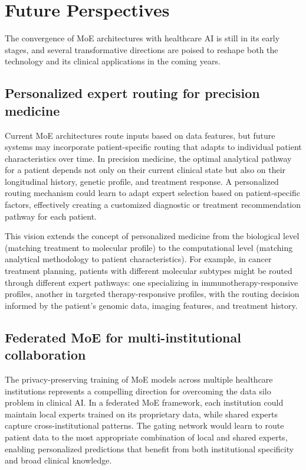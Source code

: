 
\section*{Future Perspectives}

The convergence of MoE architectures with healthcare AI is still in its early stages, and several transformative directions are poised to reshape both the technology and its clinical applications in the coming years.

\subsection*{Personalized expert routing for precision medicine}

Current MoE architectures route inputs based on data features, but future systems may incorporate patient-specific routing that adapts to individual patient characteristics over time. In precision medicine, the optimal analytical pathway for a patient depends not only on their current clinical state but also on their longitudinal history, genetic profile, and treatment response. A personalized routing mechanism could learn to adapt expert selection based on patient-specific factors, effectively creating a customized diagnostic or treatment recommendation pathway for each patient.

This vision extends the concept of personalized medicine from the biological level (matching treatment to molecular profile) to the computational level (matching analytical methodology to patient characteristics). For example, in cancer treatment planning, patients with different molecular subtypes might be routed through different expert pathways: one specializing in immunotherapy-responsive profiles, another in targeted therapy-responsive profiles, with the routing decision informed by the patient's genomic data, imaging features, and treatment history.

\subsection*{Federated MoE for multi-institutional collaboration}

The privacy-preserving training of MoE models across multiple healthcare institutions represents a compelling direction for overcoming the data silo problem in clinical AI. In a federated MoE framework, each institution could maintain local experts trained on its proprietary data, while shared experts capture cross-institutional patterns. The gating network would learn to route patient data to the most appropriate combination of local and shared experts, enabling personalized predictions that benefit from both institutional specificity and broad clinical knowledge.

